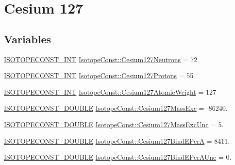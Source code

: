 \hypertarget{group___isotope_const-_cesium-_cs127}{}\section{Cesium 127}
\label{group___isotope_const-_cesium-_cs127}
\subsection*{Variables}
\begin{DoxyCompactItemize}
\item 
\mbox{\hyperlink{group___isotope_const-_macros_ga5f18360b3e99483a35c32d789e62621c}{I\+S\+O\+T\+O\+P\+E\+C\+O\+N\+S\+T\+\_\+\+I\+NT}} \mbox{\hyperlink{group___isotope_const-_cesium-_cs127_ga3631e6fd66b6274a33374a38f7f09a25}{Isotope\+Const\+::\+Cesium127\+Neutrons}} = 72
\item 
\mbox{\hyperlink{group___isotope_const-_macros_ga5f18360b3e99483a35c32d789e62621c}{I\+S\+O\+T\+O\+P\+E\+C\+O\+N\+S\+T\+\_\+\+I\+NT}} \mbox{\hyperlink{group___isotope_const-_cesium-_cs127_gac6c5251168c9599e5804169b5c0e67e1}{Isotope\+Const\+::\+Cesium127\+Protons}} = 55
\item 
\mbox{\hyperlink{group___isotope_const-_macros_ga5f18360b3e99483a35c32d789e62621c}{I\+S\+O\+T\+O\+P\+E\+C\+O\+N\+S\+T\+\_\+\+I\+NT}} \mbox{\hyperlink{group___isotope_const-_cesium-_cs127_ga980bb76a625c5f0e171bd129197ec5d7}{Isotope\+Const\+::\+Cesium127\+Atomic\+Weight}} = 127
\item 
\mbox{\hyperlink{group___isotope_const-_macros_ga8f45a7272ce02c0b4c65c44636ed719a}{I\+S\+O\+T\+O\+P\+E\+C\+O\+N\+S\+T\+\_\+\+D\+O\+U\+B\+LE}} \mbox{\hyperlink{group___isotope_const-_cesium-_cs127_gafb3ad562540ea77801397bec52db2f63}{Isotope\+Const\+::\+Cesium127\+Mass\+Exc}} = -\/86240.
\item 
\mbox{\hyperlink{group___isotope_const-_macros_ga8f45a7272ce02c0b4c65c44636ed719a}{I\+S\+O\+T\+O\+P\+E\+C\+O\+N\+S\+T\+\_\+\+D\+O\+U\+B\+LE}} \mbox{\hyperlink{group___isotope_const-_cesium-_cs127_gaa0b949581b5fb9616fe7bf508978e81a}{Isotope\+Const\+::\+Cesium127\+Mass\+Exc\+Unc}} = 5.
\item 
\mbox{\hyperlink{group___isotope_const-_macros_ga8f45a7272ce02c0b4c65c44636ed719a}{I\+S\+O\+T\+O\+P\+E\+C\+O\+N\+S\+T\+\_\+\+D\+O\+U\+B\+LE}} \mbox{\hyperlink{group___isotope_const-_cesium-_cs127_ga1c04e2816dec7ecba115c5f67e7c6d05}{Isotope\+Const\+::\+Cesium127\+Bind\+E\+PerA}} = 8411.
\item 
\mbox{\hyperlink{group___isotope_const-_macros_ga8f45a7272ce02c0b4c65c44636ed719a}{I\+S\+O\+T\+O\+P\+E\+C\+O\+N\+S\+T\+\_\+\+D\+O\+U\+B\+LE}} \mbox{\hyperlink{group___isotope_const-_cesium-_cs127_gaee00214b4c2be5a7f016347642098a19}{Isotope\+Const\+::\+Cesium127\+Bind\+E\+Per\+A\+Unc}} = 0.

\end{DoxyCompactItemize}
